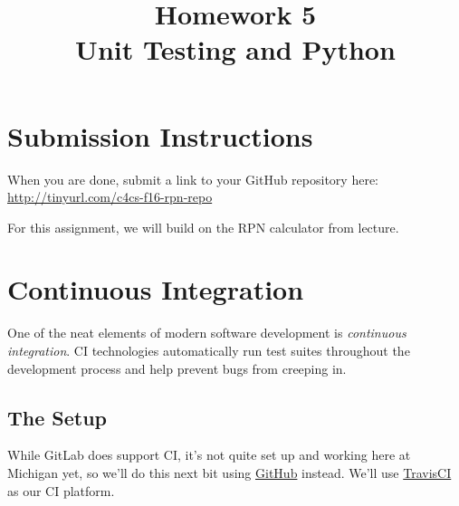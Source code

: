 \documentclass{article}
\begin{document}
\fancyhead[C]{}
\fancyhead[L]{}
\fancyhead[R]{}

\fancyfoot[C]{\color{gray} \thepage~/~\pageref*{LastPage}}
\pagestyle{fancyplain}


\title{\textbf{Homework 5\\Unit Testing and Python}}
\author{\textbf{\color{red}{Due: Saturday, October 15, 10:00PM (Hard Deadline)}}}
\date{}
\maketitle

\section*{Submission Instructions}
When you are done, submit a link to your GitHub repository here: \url{http://tinyurl.com/c4cs-f16-rpn-repo}

\bigskip

\begin{mdframed}\centering
For this assignment, we will build on the RPN calculator from lecture.
\end{mdframed}



\section{Continuous Integration}
One of the neat elements of modern software development is \emph{continuous
  integration}. CI technologies automatically run test suites throughout the
development process and help prevent bugs from creeping in.

\subsection{The Setup}

While GitLab does support CI, it's not quite set up and working here at
Michigan yet, so we'll do this next bit using
\href{https://github.com}{GitHub} instead.
We'll use \href{https://travis-ci.org/}{TravisCI} as our CI platform.
\end{document}
